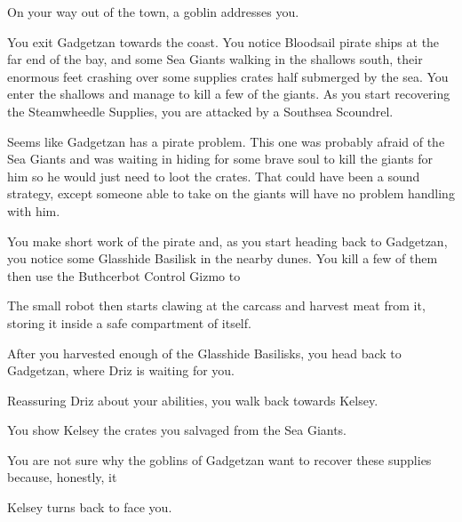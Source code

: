 

On your way out of the town, a goblin addresses you.


You exit Gadgetzan towards the coast. You notice Bloodsail pirate ships at the far end of the bay, and some Sea Giants walking in the shallows south, their enormous feet crashing over some supplies crates half submerged by the sea. You enter the shallows and manage to kill a few of the giants. As you start recovering the Steamwheedle Supplies, you are attacked by a Southsea Scoundrel.


Seems like Gadgetzan has a pirate problem. This one was probably afraid of the Sea Giants and was waiting in hiding for some brave soul to kill the giants for him so he would just need to loot the crates. That could have been a sound strategy, except someone able to take on the giants will have no problem handling with him.

You make short work of the pirate and, as you start heading back to Gadgetzan, you notice some Glasshide Basilisk in the nearby dunes. You kill a few of them then use the Buthcerbot Control Gizmo to 


The small robot then starts clawing at the carcass and harvest meat from it, storing it inside a safe compartment of itself.

After you harvested enough of the Glasshide Basilisks, you head back to Gadgetzan, where Driz is waiting for you.



Reassuring Driz about your abilities, you walk back towards Kelsey.



You show Kelsey the crates you salvaged from the Sea Giants.


You are not sure why the goblins of Gadgetzan want to recover these supplies because, honestly, it 




Kelsey turns back to face you.

